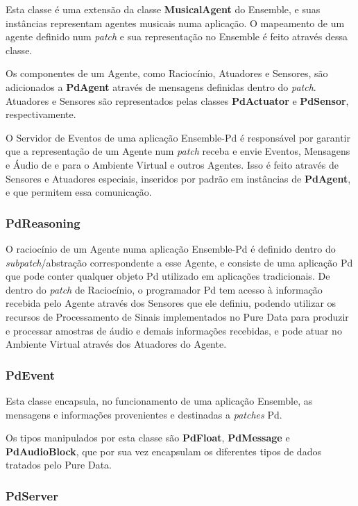 \documentclass[a4paper, 11pt, twoside]{article}
\begin{document}
\begin{multicols}{2}
Esta classe é uma extensão da classe \textbf{MusicalAgent} do Ensemble,
e suas instâncias representam agentes musicais numa aplicação.
O mapeamento de um agente definido num \textit{patch} e sua representação no 
Ensemble é feito através dessa classe.

Os componentes de um Agente, como Raciocínio, Atuadores e Sensores, são
adicionados a \textbf{PdAgent} através de mensagens definidas dentro do
\textit{patch}. Atuadores e Sensores são representados pelas classes 
\textbf{PdActuator} e \textbf{PdSensor}, respectivamente.

O Servidor de Eventos de uma aplicação Ensemble-Pd é responsável por garantir 
que a representação de um Agente num \textit{patch} receba e envie Eventos, 
Mensagens e Áudio de e para o Ambiente Virtual e outros Agentes. Isso é feito
através de Sensores e Atuadores especiais, inseridos por padrão em instâncias
de \textbf{PdAgent}, e que permitem essa comunicação.

\subsubsection{PdReasoning}

O raciocínio de um Agente numa aplicação Ensemble-Pd é definido dentro do
\textit{subpatch}/abstração correspondente a esse Agente, e consiste de
uma aplicação Pd que pode conter qualquer objeto Pd utilizado em aplicações
tradicionais. De dentro do \textit{patch} de Raciocínio, o programador Pd tem 
acesso à informação recebida pelo Agente através dos Sensores que ele definiu,
podendo utilizar os recursos de Processamento de Sinais implementados no Pure
Data para produzir e processar amostras de áudio e demais informações 
recebidas, e pode atuar no Ambiente Virtual através dos Atuadores do Agente.

\subsubsection{PdEvent}

Esta classe encapsula, no funcionamento de uma aplicação Ensemble,
as mensagens e informações provenientes e destinadas a \textit{patches} Pd.

Os tipos manipulados por esta classe são \textbf{PdFloat}, \textbf{PdMessage} e
\textbf{PdAudioBlock}, que por sua vez encapsulam os diferentes tipos de dados
tratados pelo Pure Data.

\subsubsection{PdServer}


\end{multicols}
\end{document}
